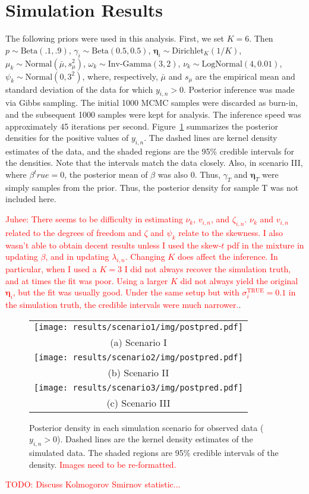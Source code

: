 \documentclass[12pt]{article} %
\newcommand{\Normal}{\text{Normal}}
\newcommand{\Beta}{\text{Beta}}
\newcommand{\InvGamma}{\text{Inv-Gamma}}
\newcommand{\Dirichlet}{\text{Dirichlet}}
\newcommand{\LogNormal}{\text{LogNormal}}
\newcommand{\true}{\text{TRUE}}
\newcommand{\alert}[1]{\textcolor{red}{#1}}
\begin{document}
\section{Simulation Results}\label{sec:sim-results}
The following priors were used in this analysis.
First, we set $K=6$. Then $p\sim\Beta(.1, .9)$, $\gamma_i\sim\Beta(0.5,
0.5)$, $\bm\eta_i\sim\Dirichlet_K(1/K)$, $\mu_k\sim\Normal(\bar{\mu}, s_\mu^2)$,
$\omega_k\sim\InvGamma(3, 2)$, $\nu_k\sim\LogNormal(4, 0.01)$,
$\psi_k\sim\Normal(0, 3^2)$, where, respectively, $\bar{\mu}$ and $s_\mu$ are
the empirical mean and standard deviation of the data for which $y_{i,n} >
0$. Posterior inference was made via Gibbs sampling. The initial 1000 MCMC
samples were discarded as burn-in, and the subsequent 1000 samples were kept
for analysis. The inference speed was approximately 45 iterations per second.
Figure~\ref{fig:sim-postdens} summarizes the posterior densities for the
positive values of $y_{i,n}$. The dashed lines are kernel density estimates
of the data, and the shaded regions are the 95\% credible intervals for the
densities. Note that the intervals match the data closely. Also, in scenario
III, where $\beta^true=0$, the posterior mean of $\beta$ was also 0. Thus,
$\gamma_T$ and $\bm\eta_T$ were simply samples from the prior. Thus, the 
posterior density for sample T was not included here.

\alert{Juhee: There seems to be difficulty in estimating $\nu_k$, $v_{i,n}$,
and $\zeta_{i,n}$. $\nu_k$ and $v_{i,n}$ related to the degrees of freedom
and $\zeta$ and $\psi_k$ relate to the skewness. I also wasn't able to obtain
decent results unless I used the skew-$t$ pdf in the mixture in updating
$\beta$, and in updating $\lambda_{i,n}$. Changing $K$ does affect the
inference. In particular, when I used a $K=3$ I did not always recover the
simulation truth, and at times the fit was poor. Using a larger $K$ did not
always yield the original $\bm\eta_i$, but the fit was usually good.
Under the same setup but with $\sigma_i^\true=0.1$ in the simulation truth,
the credible intervals were much narrower.}.

\begin{figure}[t!]
  \centering
  \begin{tabular}{c}
    \texttt{[image: results/scenario1/img/postpred.pdf]} \\
    (a) Scenario I \\
    \texttt{[image: results/scenario2/img/postpred.pdf]} \\
    (b) Scenario II \\
    \texttt{[image: results/scenario3/img/postpred.pdf]} \\
    (c) Scenario III \\
  \end{tabular}
  \caption{Posterior density in each simulation scenario for observed data
  ($y_{i,n}>0$). Dashed lines are the kernel density estimates of the
  simulated data. The shaded regions are 95\% credible intervals of the
  density. \alert{Images need to be re-formatted.}}
  \label{fig:sim-postdens}
\end{figure}

\alert{TODO: Discuss Kolmogorov Smirnov statistic...}

% 
\end{document}
